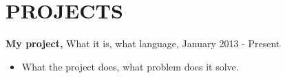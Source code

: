 \section{PROJECTS} 
    {{\bf My project,} What it is, what language}, January 2013 - Present
    \begin{itemize}
	\item What the project does, what problem does it solve.
    \end{itemize} 